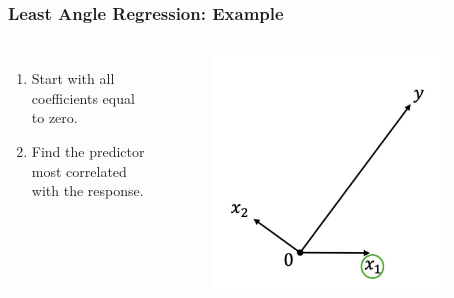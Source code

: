 \begin{frame}
\frametitle{Least Angle Regression: Example}
\begin{columns}[t]
    \begin{enumerate}
        \item Start with all coefficients equal to zero.
        \item Find the predictor most correlated with the response.
    \end{enumerate}
    
    \begin{figure}[!htbp]
        \begin{center}
            \includegraphics[width=0.9\textwidth]{img/LAR/2.jpeg}
        \end{center}
    \end{figure}
\end{columns}
\end{frame}

